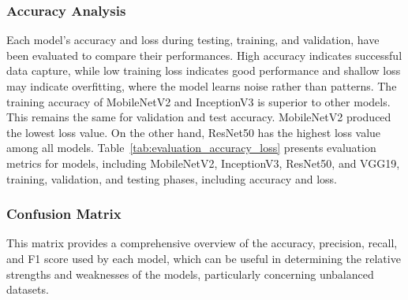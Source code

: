 \documentclass{ijcaArticle}
\begin{document}
\subsubsection{Accuracy Analysis}
Each model's accuracy and loss during testing, training, and validation, have been evaluated to compare their performances. High accuracy indicates successful data capture, while low training loss indicates good performance and shallow loss may indicate overfitting, where the model learns noise rather than patterns. The training accuracy of MobileNetV2 and InceptionV3 is superior to other models. This remains the same for validation and test accuracy. MobileNetV2 produced the lowest loss value. On the other hand, ResNet50 has the highest loss value among all models. Table~\ref{tab:evaluation_accuracy_loss} presents evaluation metrics for models, including MobileNetV2, InceptionV3, ResNet50, and VGG19, training, validation, and testing phases, including accuracy and loss.

\begin{table}[htbp]
\label{tab:evaluation_accuracy_loss}
\end{table}

\subsubsection{Confusion Matrix}
This matrix provides a comprehensive overview of the accuracy, precision, recall, and F1 score used by each model, which can be useful in determining the relative strengths and weaknesses of the models, particularly concerning unbalanced datasets.
\end{document}
